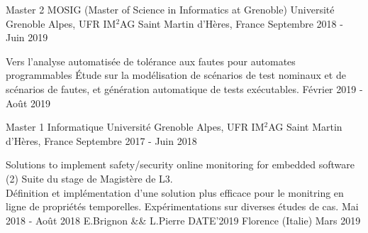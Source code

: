 


\begin{cventries}



\cventry
{Master 2 MOSIG (Master of Science in Informatics at Grenoble)} %
{Université Grenoble Alpes, UFR IM$^2$AG} %
{Saint Martin d'Hères, France} %
{Septembre 2018 - Juin 2019} %
{}

%
{}%
{}%
{}%
{
  \begin{cvdescription}
    {Vers l'analyse automatisée de tolérance aux fautes pour automates
      programmables}%
    {Étude sur la modélisation de scénarios de test nominaux et de
      scénarios de fautes, et génération automatique de tests
      exécutables.}%
    {Février 2019 - Août 2019}
  \end{cvdescription}
}

\vspace{-.5cm}


\cventry
{Master 1 Informatique} %
{Université Grenoble Alpes, UFR IM$^2$AG} %
{Saint Martin d'Hères, France} %
{Septembre 2017 - Juin 2018} %
{}

%
{}%
{}%
{}%
{
  \begin{cvdescription}
    {Solutions to implement safety/security online monitoring for
      embedded software (2)}%
    {Suite du stage de Magistère de L3.\\
      Définition et implémentation d'une solution plus efficace pour
      le monitring en ligne de propriétés
      temporelles. Expérimentations sur diverses études de cas.}%
    {Mai 2018 - Août 2018}
    {E.Brignon \&\& L.Pierre}%
    {DATE'2019}%
    {Florence (Italie)}%
    {Mars 2019}
  \end{cvdescription}
}


\end{cventries}
